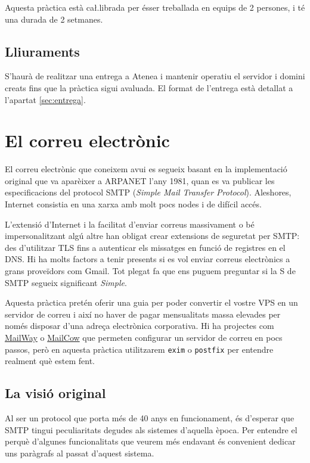 \documentclass{practicaitic}
\begin{document}
Aquesta pràctica està ca\l.librada per ésser treballada en equips de 2 persones,
i té una durada de 2 setmanes.

\subsection{Lliuraments}

S'haurà de realitzar una entrega a Atenea i mantenir operatiu el servidor 
i domini creats fins que la pràctica sigui avaluada. El format de l'entrega
està detallat a l'apartat \ref{sec:entrega}.

\section{El correu electrònic}

El correu electrònic que coneixem avui es segueix basant en la
implementació original que va aparèixer a ARPANET l'any
1981, quan es va publicar les especificacions del protocol SMTP
(\textit{Simple Mail Transfer Protocol}). Aleshores, Internet consistia
en una xarxa amb molt pocs nodes i de difícil accés.

L'extensió d'Internet i la facilitat d'enviar correus massivament o bé
impersonalitzant algú altre han obligat crear extensions de seguretat per
SMTP: des d'utilitzar TLS fins a autenticar els missatges en funció
de registres en el DNS. Hi ha molts factors a tenir presents si
es vol enviar correus electrònics a grans proveïdors com Gmail.
Tot plegat fa que ens puguem preguntar si la S de SMTP segueix
significant \textit{Simple}. %

Aquesta pràctica pretén oferir una guia per poder convertir el vostre
VPS en un servidor de correu i així no haver de pagar mensualitats 
massa elevades per només disposar d'una adreça electrònica corporativa.
Hi ha projectes com \href{https://docs.mailway.app/self-host/}{MailWay} o 
\href{https://docs.mailcow.email}{MailCow} que permeten configurar un
servidor de correu en pocs passos, però en aquesta pràctica utilitzarem
\texttt{exim} o \texttt{postfix} per entendre realment què estem fent.

\subsection{La visió original}

Al ser un protocol que porta més de 40 anys en funcionament, és d'esperar
que SMTP tingui peculiaritats degudes als sistemes d'aquella època. Per
entendre el perquè d'algunes funcionalitats que veurem més endavant és
convenient dedicar uns paràgrafs al passat d'aquest sistema.
\end{document}

